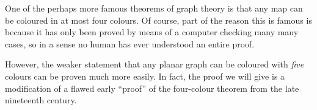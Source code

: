 \documentclass[nobib]{tufte-handout}
\begin{document}
One of the perhaps more famous theorems of graph theory is that any map can be coloured in at most four colours. Of course, part of the reason this is famous is because it has only been proved by means of a computer checking many many cases, so in a sense no human has ever understood an entire proof.

However, the weaker statement that any planar graph can be coloured with \emph{five} colours can be proven much more easily. In fact, the proof we will give is a modification of a flawed early ``proof'' of the four-colour theorem from the late nineteenth century.
\end{document}
